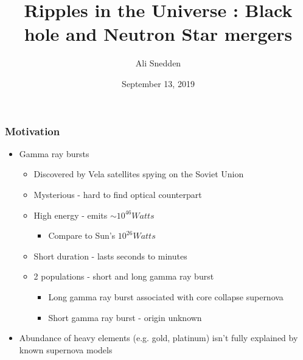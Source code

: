 \documentclass{beamer}
\title{Ripples in the Universe : Black hole and Neutron Star mergers}
\author{Ali Snedden
}
\date{September 13, 2019}
\begin{document}
\begin{frame}
\titlepage
\end{frame}






%
%
\begin{frame}
\frametitle{Motivation}
\begin{itemize}
    \item Gamma ray bursts
    \pause
    \begin{itemize}
        \item Discovered by Vela satellites spying on the Soviet Union
        \pause
        \item Mysterious - hard to find optical counterpart
        \pause
        \item High energy - emits $\sim 10^{46} Watts$ 
        \pause
        \begin{itemize}
            \item Compare to Sun's $10^{26} Watts$
        \end{itemize}
        \pause
        \item Short duration - lasts seconds to minutes
        \pause
        \item 2 populations - short and long gamma ray burst
        \begin{itemize}
            \pause
            \item Long gamma ray burst associated with core collapse supernova
            \pause
            \item Short gamma ray burst - origin unknown
        \end{itemize}
    \end{itemize}
    \pause
    \item Abundance of heavy elements (e.g. gold, platinum) isn't fully explained by known supernova models
\end{itemize}
\end{frame}
\end{document}
